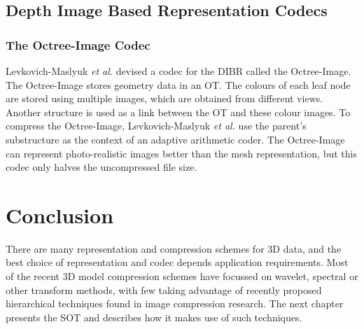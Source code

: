 \subsection{Depth Image Based Representation Codecs}

\subsubsection{The Octree-Image Codec}

Levkovich-Maslyuk \textit{et al.} \cite{Levkovich04Depth} devised a codec for the DIBR called the Octree-Image. The Octree-Image stores geometry data in an OT. The colours of each leaf node are stored using multiple images, which are obtained from different views. Another structure is used as a link between the OT and these colour images. To compress the Octree-Image, Levkovich-Maslyuk \textit{et al.} use the parent's substructure as the context of an adaptive arithmetic coder. The Octree-Image can represent photo-realistic images better than the mesh representation, but this codec only halves the uncompressed file size.  


\section{Conclusion}

There are many representation and compression schemes for 3D data, and the best choice of representation and codec depends application requirements. Most of the recent 3D model compression schemes have focussed on wavelet, spectral or other transform methods, with few taking advantage of recently proposed hierarchical techniques found in image compression research. The next chapter presents the SOT and describes how it makes use of such techniques.

